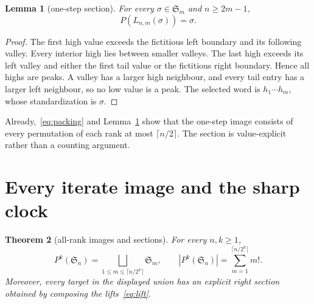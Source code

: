 \documentclass[a4paper,10pt]{amsart}
\newtheorem{theorem}{Theorem}
\newtheorem{lemma}[theorem]{Lemma}
\theoremstyle{definition}
\theoremstyle{remark}
\newcommand{\Sn}{\mathfrak S}
\begin{document}
\begin{lemma}[one-step section]\label{lem:section}
For every $\sigma\in\Sn_m$ and $n\ge2m-1$,
\begin{equation}\label{eq:right-inverse}
                       P(L_{n,m}(\sigma))=\sigma.
\end{equation}
\end{lemma}

\begin{proof}
The first high value exceeds the fictitious left boundary and its following
valley.  Every interior high lies between smaller valleys.  The last high
exceeds its left valley and either the first tail value or the fictitious
right boundary.  Hence all highs are peaks.  A valley has a larger high
neighbour, and every tail entry has a larger left neighbour, so no low value
is a peak.  The selected word is $h_1\cdots h_m$, whose standardization is
$\sigma$.
\end{proof}

Already,~\eqref{eq:packing} and Lemma~\ref{lem:section} show that the one-step
image consists of every permutation of each rank at most $\lceil n/2\rceil$.
The section is value-explicit rather than a counting argument.

\section{Every iterate image and the sharp clock}

\begin{theorem}[all-rank images and sections]\label{thm:images}
For every $n,k\ge1$,
\begin{equation}\label{eq:iterate-image}
 P^k(\Sn_n)=
 \bigsqcup_{1\le m\le\lceil n/2^k\rceil}\Sn_m,
 \qquad
 |P^k(\Sn_n)|=\sum_{m=1}^{\lceil n/2^k\rceil}m!.
\end{equation}
Moreover, every target in the displayed union has an explicit right section
obtained by composing the lifts~\eqref{eq:lift}.
\end{theorem}
\end{document}
